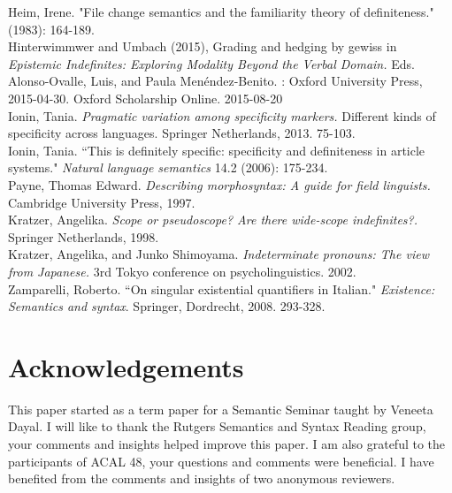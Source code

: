 \documentclass[output=paper,modfonts]{langsci/langscibook}
\begin{document}
Heim, Irene. "File change semantics and the familiarity theory of definiteness." (1983): 164-189.\\
Hinterwimmwer and  Umbach (2015), Grading and hedging by gewiss in \emph{Epistemic Indefinites: Exploring Modality Beyond the Verbal Domain.} Eds. Alonso-Ovalle, Luis, and Paula Menéndez-Benito. : Oxford University Press, 2015-04-30. Oxford Scholarship Online. 2015-08-20\\
Ionin, Tania. \emph{Pragmatic variation among specificity markers.} Different kinds of specificity across languages. Springer Netherlands, 2013. 75-103.\\
Ionin, Tania. ``This is definitely specific: specificity and definiteness in article systems." \emph{Natural language semantics} 14.2 (2006): 175-234.\\
Payne, Thomas Edward. \emph{Describing morphosyntax: A guide for field linguists.} Cambridge University Press, 1997.\\
Kratzer, Angelika. \emph{Scope or pseudoscope? Are there wide-scope indefinites?.} Springer Netherlands, 1998.
\\Kratzer, Angelika, and Junko Shimoyama. \emph{Indeterminate pronouns: The view from Japanese.} 3rd Tokyo conference on psycholinguistics. 2002.\\
Zamparelli, Roberto. ``On singular existential quantifiers in Italian." \emph{Existence: Semantics and syntax}. Springer, Dordrecht, 2008. 293-328.

\section*{Acknowledgements}
This paper started as a term paper for a Semantic Seminar taught by Veneeta Dayal. I will like to thank the Rutgers Semantics and Syntax Reading group, your comments and insights helped improve this paper. I am also grateful to the participants of  ACAL 48, your questions and comments were beneficial. I have benefited from the comments and insights of two anonymous reviewers. 
\end{document}
